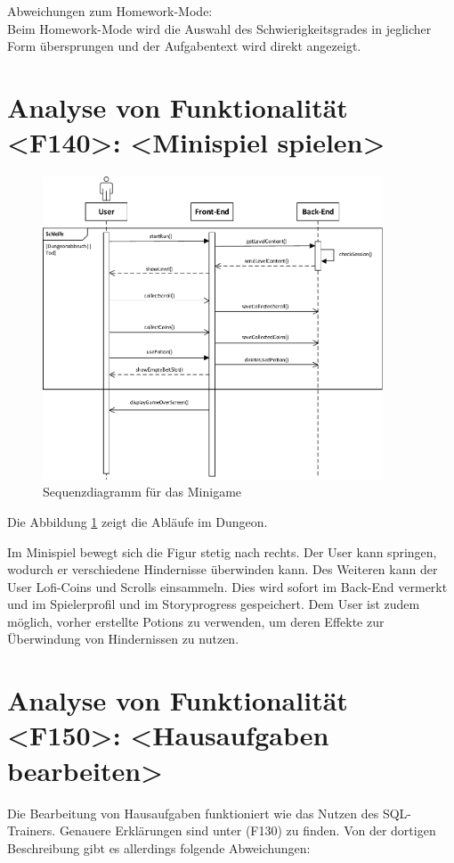 Abweichungen zum Homework-Mode:\\
Beim Homework-Mode wird die Auswahl des Schwierigkeitsgrades in jeglicher Form übersprungen und der Aufgabentext wird direkt angezeigt.  

\newpage
\section{Analyse von Funktionalität <F140>: <Minispiel spielen>}
\begin{figure}[h]
\centering
\includegraphics[width=0.9\textwidth]{figures/sequenz_F140.pdf}
\caption{Sequenzdiagramm für das Minigame}
\label{sequence_f140}
\end{figure}
Die Abbildung \ref{sequence_f140} zeigt die Abläufe im Dungeon.

Im Minispiel bewegt sich die Figur stetig nach rechts. Der User kann springen, wodurch er verschiedene Hindernisse überwinden kann. Des Weiteren kann der User Lofi-Coins und Scrolls einsammeln. Dies wird sofort im Back-End vermerkt und im Spielerprofil und im Storyprogress gespeichert. Dem User ist zudem möglich, vorher erstellte Potions zu verwenden, um deren Effekte zur Überwindung von Hindernissen zu nutzen.


\section{Analyse von Funktionalität <F150>: <Hausaufgaben bearbeiten>}
Die Bearbeitung von Hausaufgaben funktioniert wie das Nutzen des SQL-Trainers. Genauere Erklärungen sind unter (F130) zu finden. Von der dortigen Beschreibung gibt es allerdings folgende Abweichungen: 

